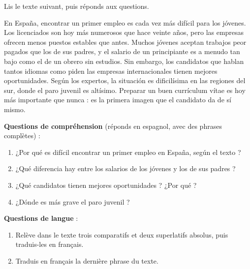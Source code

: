 \documentclass[11pt]{article}
\begin{document}
\begin{exercice}
Lis le texte suivant, puis réponds aux questions.
\begin{textebox}
En España, encontrar un primer empleo es cada vez más difícil para los jóvenes. Los licenciados son hoy más numerosos que hace veinte años, pero las empresas ofrecen menos puestos estables que antes. Muchos jóvenes aceptan trabajos peor pagados que los de sus padres, y el salario de un principiante es a menudo tan bajo como el de un obrero sin estudios. Sin embargo, los candidatos que hablan tantos idiomas como piden las empresas internacionales tienen mejores oportunidades. Según los expertos, la situación es dificilísima en las regiones del sur, donde el paro juvenil es altísimo. Preparar un buen currículum vítae es hoy más importante que nunca : es la primera imagen que el candidato da de sí mismo.
\end{textebox}
\textbf{Questions de compréhension} (réponds en espagnol, avec des phrases complètes) :
\begin{enumerate}
\item ¿Por qué es difícil encontrar un primer empleo en España, según el texto ?
\item ¿Qué diferencia hay entre los salarios de los jóvenes y los de sus padres ?
\item ¿Qué candidatos tienen mejores oportunidades ? ¿Por qué ?
\item ¿Dónde es más grave el paro juvenil ?
\end{enumerate}
\textbf{Questions de langue} :
\begin{enumerate}
\item Relève dans le texte trois comparatifs et deux superlatifs absolus, puis traduis-les en français.
\item Traduis en français la dernière phrase du texte.
\end{enumerate}
\end{exercice}
\end{document}
